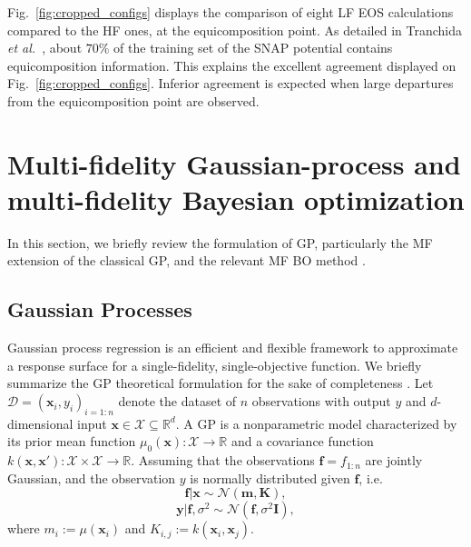 \documentclass[%
 reprint,
aip,jcp
]{revtex4-1}
\begin{document}
Fig.~\ref{fig:cropped_configs} displays the comparison of eight LF
EOS calculations compared to the HF ones, at the equicomposition point.
As detailed in Tranchida \emph{et al.}~\cite{tranchida2020AlNbTi_SNAP}, 
about $70\%$ of the training set of the SNAP potential contains 
equicomposition information. 
This explains the excellent agreement displayed on
Fig.~\ref{fig:cropped_configs}.
Inferior agreement is expected when large departures from the
equicomposition point are observed.




\section{Multi-fidelity Gaussian-process and multi-fidelity Bayesian optimization}
\label{sec:MFGP}


In this section, we briefly review the formulation of GP, particularly the MF extension of the classical GP, and the relevant MF BO method \cite{tran2020smfbo2cogp,tran2019sbfbo2cogp}. 


\subsection{Gaussian Processes}

Gaussian process regression is an efficient and flexible framework to approximate a response surface for a single-fidelity, single-objective function. 
We briefly summarize the GP theoretical formulation for the sake of completeness \cite{shahriari2016taking}. 
Let $\mathcal{D} = (\bm{x}_i, y_i)_{i=1:n}$ denote the dataset of $n$ observations with output $y$ and $d$-dimensional input $\bm{x} \in \mathcal{X} \subseteq \mathbb{R}^d$. 
A GP is a nonparametric model characterized by its prior mean function $\mu_0(\bm{x}): \mathcal{X} \to \mathbb{R}$ and a covariance function $k(\bm{x},\bm{x'}): \mathcal{X} \times \mathcal{X} \to \mathbb{R}$. 
Assuming that the observations $\bm{f}=f_{1:n}$ are jointly Gaussian, and the observation $y$ is normally distributed given $\bm{f}$, i.e. 
\begin{equation}
\bm{f} | \bm{x} \sim \mathcal{N}(\bm{m}, \bm{K}),
\end{equation} 
\begin{equation}
\bm{y} | \bm{f},\sigma^2 \sim \mathcal{N}(\bm{f}, \sigma^2 \bm{I}),
\end{equation} 
where $m_i:=\mu(\bm{x}_i)$ and $K_{i,j}:= k(\bm{x}_i, \bm{x}_j)$. 
\end{document}
